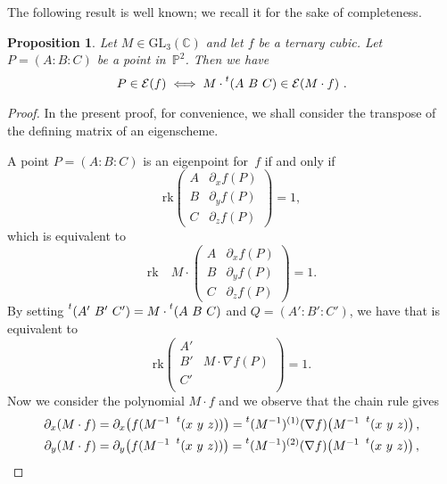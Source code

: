\documentclass{amsart}
\theoremstyle{plain}
\newtheorem{prop}[lemma]{Proposition}
\theoremstyle{definition}
\newcommand{\C}{\mathbb{C}}
\newcommand{\p}{\mathbb{P}}
\newcommand{\de}{\partial}
\newcommand{\Eig}[1]{\mathcal{E}\!\left( {#1} \right)}
\newcommand{\rk}{\ensuremath{\mathrm{rk}}}
\begin{document}
The following result is well known; we recall it for the sake of completeness.

\begin{prop}
 Let $M \in \mathrm{GL}_3(\C)$ and let $f$ be a ternary cubic.
 Let $P = (A: B: C)$ be a point in~$\p^2$.
 Then we have
 \[
  P \in \Eig{f} \iff M \cdot \prescript{t} {}(A \ B \ C) \in \Eig{M \cdot f} \,.
 \]
\end{prop}
\begin{proof}
In the present proof,
for convenience, we shall consider the transpose of the defining matrix of an eigenscheme.

A point $P = (A: B: C)$ is an eigenpoint for~$f$ if and only if
\begin{equation*}
  \mathrm{rk}  \begin{pmatrix}
    A & \de_x f(P) \\
    B & \de_y f(P)  \\
    C & \de_z f(P)
    \end{pmatrix}=1,
\end{equation*}
which is equivalent to
\begin{equation}
\label{eq:def_matrix_M}
    \mathrm{rk} \quad  M  \cdot \begin{pmatrix}
    A & \de_x f(P) \\
    B & \de_y f(P)  \\
    C & \de_z f(P)
    \end{pmatrix}
    =1.
\end{equation}
By setting $\prescript{t} {}(A' \ B' \ C' )= M \cdot \prescript{t} {}(A \ B \ C) $ and $Q=(A':B':C')$, we have that 
is equivalent to
%
\begin{equation}
\label{eq:transformed}
  \rk
  \begin{pmatrix}
    A' &  \\
    B' & M \cdot \nabla f (P) \\
    C' & \\
  \end{pmatrix}=1.
\end{equation}
%
Now we consider the polynomial $M \cdot f$ and we observe that the chain rule gives
%
\begin{gather*}
\partial_x (M\cdot f) = \partial_x \bigl( f(M^{-1}  \ \prescript{t} {} (x \ y \ z)) \bigr) = \prescript{t} {}(M^{-1})^{(1)}(\nabla f) \bigl( M^{-1}\   \prescript{t} {} (x \ y \ z) \bigr) \,, \\
\partial_y (M\cdot f) = \partial_y \bigl( f(M^{-1}  \ \prescript{t} {} (x \ y \ z)) \bigr) = \prescript{t} {}(M^{-1})^{(2)}(\nabla f) \bigl( M^{-1}\   \prescript{t} {} (x \ y \ z) \bigr) \,, \\

\end{gather*}
\end{proof}
\end{document}
